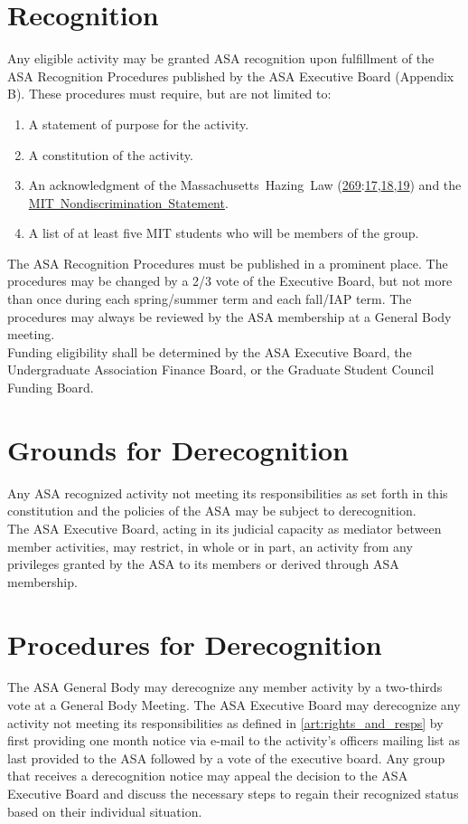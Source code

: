 \documentclass[12pt]{article}
\newcommand{\MHL}{%
    Massachusetts~Hazing~Law (\href{https://malegislature.gov/Laws/GeneralLaws/PartIV/TitleI/Chapter269}{269}:\href{https://malegislature.gov/Laws/GeneralLaws/PartIV/TitleI/Chapter269/Section17}{17},\href{https://malegislature.gov/Laws/GeneralLaws/PartIV/TitleI/Chapter269/Section18}{18},\href{https://malegislature.gov/Laws/GeneralLaws/PartIV/TitleI/Chapter269/Section19}{19})\xspace
}
\newcommand{\NDS}{\href{https://handbook.mit.edu/nondiscrimination}{MIT~Nondiscrimination~Statement}\xspace}
\begin{document}
\newpage

\label{art:group_recog}


\section{Recognition}
\label{art:II_sect1}
Any eligible activity may be granted ASA recognition upon fulfillment of the ASA Recognition
Procedures published by the ASA Executive Board (Appendix B). These procedures must require, but
are not limited to:
\begin{enumerate}[noitemsep, label=\arabic*.]
    \item A statement of purpose for the activity.
    \item A constitution of the activity.
    \item An acknowledgment of the \MHL and the \NDS.
    \item A list of at least five MIT students who will be members of the group.
\end{enumerate}

The ASA Recognition Procedures must be published in a prominent place. The procedures may be
changed by a 2/3 vote of the Executive Board, but not more than once during each spring/summer
term and each fall/IAP term. The procedures may always be reviewed by the ASA membership at a
General Body meeting.
\\

Funding eligibility shall be determined by the ASA Executive Board, the Undergraduate Association
Finance Board, or the Graduate Student Council Funding Board.

\section{Grounds for Derecognition}
Any ASA recognized activity not meeting its responsibilities as set forth in this constitution and the
policies of the ASA may be subject to derecognition.
\\

The ASA Executive Board, acting in its judicial capacity as mediator between member activities, may
restrict, in whole or in part, an activity from any privileges granted by the ASA to its members or
derived through ASA membership.

\section{Procedures for Derecognition}
The ASA General Body may derecognize any member activity by a two-thirds vote at a General Body
Meeting. The ASA Executive Board may derecognize any activity not meeting its responsibilities as
defined in \ref{art:rights_and_resps} by first providing one month notice via e-mail to the activity’s officers mailing list
as last provided to the ASA followed by a vote of the executive board. Any group that receives a
derecognition notice may appeal the decision to the ASA Executive Board and discuss the necessary
steps to regain their recognized status based on their individual situation.
\end{document}
